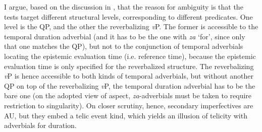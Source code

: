 \documentclass[output=paper]{langscibook}
\begin{document}
\noindent I argue, based on the discussion in , that the reason for ambiguity is that the tests target different structural levels, corresponding to different predicates. One level is the QP, and the other the reverbalizing \textit{v}P. The former is accessible to the temporal duration adverbial (and it has to be the one with \textit{za} `for', since only that one matches the QP), but not to the conjunction of temporal adverbials locating the epistemic evaluation time (i.e. reference time), because the epistemic evaluation time is only specified for the reverbalized structure. The reverbalizing \textit{v}P is hence accessible to both kinds of temporal adverbials, but without another QP on top of the reverbalizing \textit{v}P, the temporal duration adverbial has to be the bare one (on the adopted view of aspect, \textit{za}-adverbials must be taken to require restriction to singularity). On closer scrutiny, hence, secondary imperfectives are AU, but they embed a telic event kind, which yields an illusion of telicity with adverbials for duration.\largerpage
\end{document}
